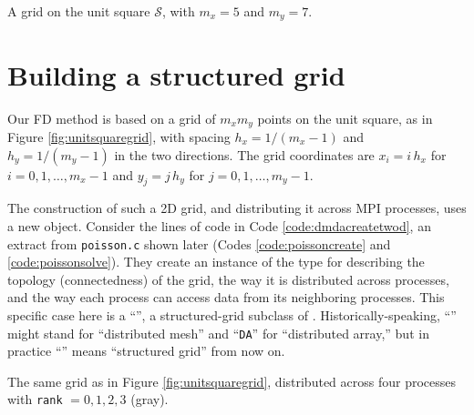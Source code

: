 \begin{marginfigure}

\caption{A grid on the unit square $\mathcal{S}$, with $m_x=5$ and $m_y=7$.}
\label{fig:unitsquaregrid}
\end{marginfigure}

\section{Building a structured grid}

Our FD method is based on a grid of $m_x m_y$ points on the unit square, as in Figure \ref{fig:unitsquaregrid}, with spacing $h_x=1/(m_x-1)$ and $h_y=1/(m_y-1)$ in the two directions.  The grid coordinates are $x_i = i\, h_x$ for $i = 0,1,\dots,m_x-1$ and $y_j = j\, h_y$ for $j=0,1,\dots,m_y-1$.

The construction of such a 2D grid, and distributing it across MPI processes, uses a new \PETSc object.  Consider the lines of code in Code \ref{code:dmdacreatetwod}, an extract from \texttt{poisson.c} shown later (Codes \ref{code:poissoncreate} and \ref{code:poissonsolve}).  They create an instance of the \PETSc \pDM type for describing the topology (connectedness) of the grid, the way it is distributed across \MPI processes, and the way each process can access data from its neighboring processes.  This specific case here is a ``\pDMDA'', a structured-grid subclass of \pDMs.  Historically-speaking, ``\pDM'' might stand for ``distributed mesh'' and ``\texttt{DA}'' for ``distributed array,'' but in practice ``\pDMDA'' means ``structured grid'' from now on.


\begin{marginfigure}

\caption{The same grid as in Figure \ref{fig:unitsquaregrid}, distributed across four \MPI processes with \texttt{rank} $=0,1,2,3$ (gray).}
\label{fig:unitsquaregridparallel}
\end{marginfigure}

